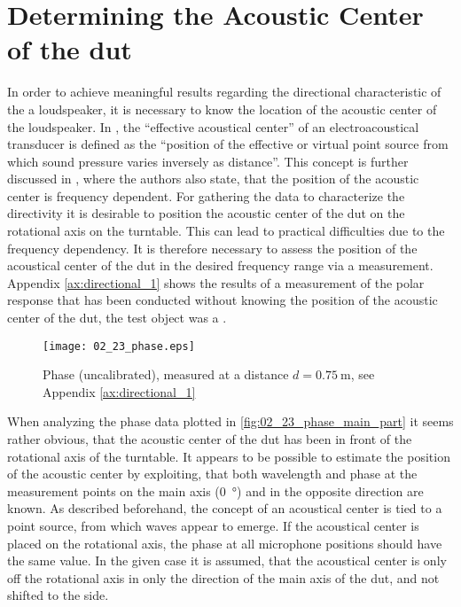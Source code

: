 \section{Determining the Acoustic Center of the \gls{dut}}\label{sec:ac_center}
In order to achieve meaningful results regarding the directional characteristic of the a loudspeaker, it is necessary to know the location of the  acoustic center of the loudspeaker.
In \citep{ansis1.1}, the ``effective acoustical center'' of an electroacoustical transducer is defined as the ``position of the effective or virtual point source from which sound pressure varies inversely as distance''. This concept is further discussed in \citep{jacobsenetal}, where the authors also state, that the position of the acoustic center is frequency dependent. For gathering the data to characterize the directivity it is desirable to position the acoustic center of the \gls{dut} on the rotational axis on the turntable. This can lead to practical difficulties due to the frequency dependency. It is therefore necessary to assess the position of the acoustical center of the \gls{dut} in the desired frequency range via a measurement.\\
Appendix \ref{ax:directional_1} shows the results of a measurement of the polar response that has been conducted without knowing the position of the acoustic center of the \gls{dut}, the test object was a \citep{seas33}. 
\begin{figure}[htbp]
	\centering
	\texttt{[image: 02\_23\_phase.eps]}
	\caption{Phase (uncalibrated), measured at a distance $d = \SI{0.75}{\meter}$, see Appendix \ref{ax:directional_1}}
		\label{fig:02_23_phase_main_part}
\end{figure}
When analyzing the phase data plotted in \autoref{fig:02_23_phase_main_part} it seems rather obvious, that the acoustic center of the \gls{dut} has been in front of the rotational axis of the turntable. 
It appears to be possible to estimate the position of the acoustic center by exploiting, that both wavelength and phase at the measurement points on the main axis (\SI{0}{\degree}) and in the opposite direction are known. As described beforehand, the concept of an acoustical center is tied to a  point source, from which waves appear to emerge. If the acoustical center is placed  on the rotational axis, the phase at all microphone positions should have the same value. In the given case it is assumed, that the acoustical center is only off the rotational axis in only the direction of the main axis of the \gls{dut}, and not shifted to the side.
